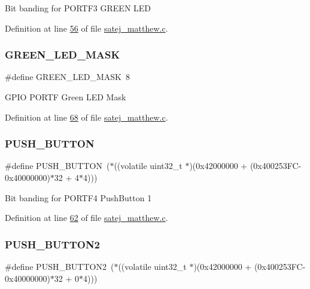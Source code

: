 Bit banding for P\+O\+R\+T\+F3 G\+R\+E\+EN L\+ED 

Definition at line \mbox{\hyperlink{satej__matthew_8c_source_l00056}{56}} of file \mbox{\hyperlink{satej__matthew_8c_source}{satej\+\_\+matthew.\+c}}.

\mbox{\label{satej__matthew_8c_a102cef24f52add2a38ee01eccbf27bcb}} 
\subsubsection{\texorpdfstring{GREEN\_LED\_MASK}{GREEN\_LED\_MASK}}
{\footnotesize\ttfamily \#define G\+R\+E\+E\+N\+\_\+\+L\+E\+D\+\_\+\+M\+A\+SK~8}

G\+P\+IO P\+O\+R\+TF Green L\+ED Mask 

Definition at line \mbox{\hyperlink{satej__matthew_8c_source_l00068}{68}} of file \mbox{\hyperlink{satej__matthew_8c_source}{satej\+\_\+matthew.\+c}}.

\mbox{\label{satej__matthew_8c_aebf19233811cf4cf11ddeb722b6a2850}} 
\subsubsection{\texorpdfstring{PUSH\_BUTTON}{PUSH\_BUTTON}}
{\footnotesize\ttfamily \#define P\+U\+S\+H\+\_\+\+B\+U\+T\+T\+ON~($\ast$((volatile uint32\+\_\+t $\ast$)(0x42000000 + (0x400253\+F\+C-\/0x40000000)$\ast$32 + 4$\ast$4)))}

Bit banding for P\+O\+R\+T\+F4 Push\+Button 1 

Definition at line \mbox{\hyperlink{satej__matthew_8c_source_l00062}{62}} of file \mbox{\hyperlink{satej__matthew_8c_source}{satej\+\_\+matthew.\+c}}.

\mbox{\label{satej__matthew_8c_afc15afb38fa2f0f9fb1448682c2fd356}} 
\subsubsection{\texorpdfstring{PUSH\_BUTTON2}{PUSH\_BUTTON2}}
{\footnotesize\ttfamily \#define P\+U\+S\+H\+\_\+\+B\+U\+T\+T\+O\+N2~($\ast$((volatile uint32\+\_\+t $\ast$)(0x42000000 + (0x400253\+F\+C-\/0x40000000)$\ast$32 + 0$\ast$4)))}

